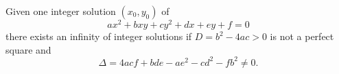 \begin{proposition}\label{eq:017}
    Given one integer solution $(x_0,y_0)$ of
\[
    ax^2+bxy+cy^2+dx+ey+f=0
\]
    there exists an infinity of integer solutions if $D=b^2-4ac>0$ is not a perfect square and
\[
    \Delta=4acf+bde-ae^2-cd^2-fb^2\ne0.
\]
\end{proposition}
